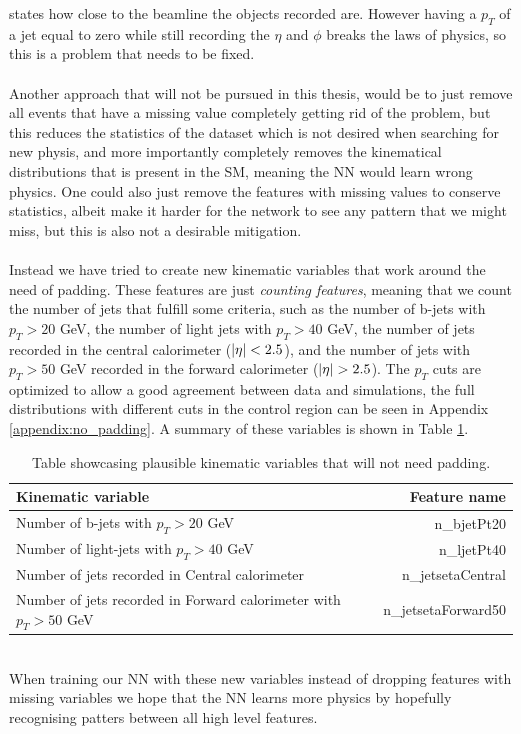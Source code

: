 \documentclass[12pt, a4paper]{book}
\begin{document}
states how close to the beamline the objects recorded are. However having a $p_T$ of a jet equal to zero while still recording the $\eta$ and $\phi$ breaks the laws of physics, so this is a problem that needs to be fixed.\\
\\Another approach that will not be pursued in this thesis, would be to just remove all events that have a missing value completely getting rid of the problem, but this reduces the statistics of the dataset which is not desired when searching for new physis, and more importantly completely 
removes the kinematical distributions that is present in the SM, meaning the NN would learn wrong physics.
One could also just remove the features with missing values to conserve statistics, albeit make it harder for the network to see any pattern that we might miss, but this is also not a desirable mitigation.\\
\\Instead we have tried to create new kinematic variables that work around the need of padding. These features are just \textit{counting features}, meaning that we count the number of jets that fulfill some criteria, 
such as the number of b-jets with $p_T > 20$ GeV, the number of light jets with $p_T>40$ GeV, the number of jets recorded in the central calorimeter ($\abs{\eta} < 2.5$), and the number of 
jets with $p_T>50$ GeV recorded in the forward calorimeter ($\abs{\eta} > 2.5$). The $p_T$ cuts are optimized to allow a good agreement between data and simulations, the full distributions with different cuts in the control region can be seen in Appendix \ref{appendix:no_padding}. 
A summary of these variables is shown in Table \ref{tab:padding_variables}.\\
\begin{table}[!h]
   \centering
   \caption[New kinematic variables that need no padding]{Table showcasing plausible kinematic variables that will not need padding.}
   \begin{tabular}{l|r}\midrule\midrule
      Kinematic variable                                                      & Feature name          \\\midrule
      Number of b-jets with $p_T > 20$ GeV                                    & n\_bjetPt20\\
      Number of light-jets with $p_T > 40$ GeV                                & n\_ljetPt40\\
      Number of jets recorded in Central calorimeter                          &n\_jetsetaCentral\\
      Number of jets recorded in Forward calorimeter with $p_T > 50$ GeV      & n\_jetsetaForward50\\\midrule\midrule
   \end{tabular}
   \label{tab:padding_variables}
\end{table}
\\When training our NN with these new variables instead of dropping features with missing variables we hope that the NN learns more physics by hopefully recognising patters between all high level features. 
\end{document}
